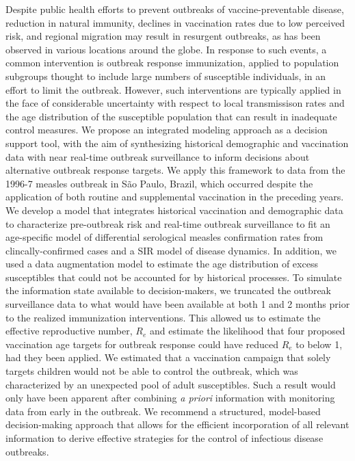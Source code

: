 Despite public health efforts to prevent outbreaks of vaccine-preventable disease, reduction in natural immunity, declines in vaccination rates due to low perceived risk, and regional migration may result in resurgent outbreaks, as has been observed in various locations around the globe. In response to such events, a common intervention is outbreak response immunization, applied to population subgroups thought to include large numbers of susceptible individuals, in an effort to limit the outbreak. However, such interventions are typically applied in the face of considerable uncertainty with respect to local transmissison rates and the age distribution of the susceptible population that can result in inadequate control measures. We propose an integrated modeling approach as a decision support tool, with the aim of synthesizing historical demographic and vaccination data with near real-time outbreak surveillance to inform decisions about alternative outbreak response targets. We apply this framework to data from the 1996-7 measles outbreak in S\~{a}o Paulo, Brazil, which occurred despite the application of both routine and supplemental vaccination in the preceding years. We develop a model that integrates historical vaccination and demographic data to characterize pre-outbreak risk and real-time outbreak surveillance to fit an age-specific model of differential serological measles confirmation rates from clincally-confirmed cases and a SIR model of disease dynamics.  In addition, we used a data augmentation model to estimate the age distribution of excess susceptibles that could not be accounted for by historical processes. To simulate the information state available to decision-makers, we truncated the outbreak surveillance data to what would have been available at both 1 and 2 months prior to the realized immunization interventions. This allowed us to estimate the effective reproductive number, \(R_e\) and estimate the likelihood that four proposed vaccination age targets for outbreak response could have reduced \(R_e\) to below 1, had they been applied.  We estimated that a vaccination campaign that solely targets children would not be able to control the outbreak, which was characterized by an unexpected pool of adult susceptibles. Such a result would only have been apparent after combining \textit{a priori} information with monitoring data from early in the outbreak. We recommend a structured, model-based decision-making approach that allows for the efficient incorporation of all relevant information to derive effective strategies for the control of infectious disease outbreaks.